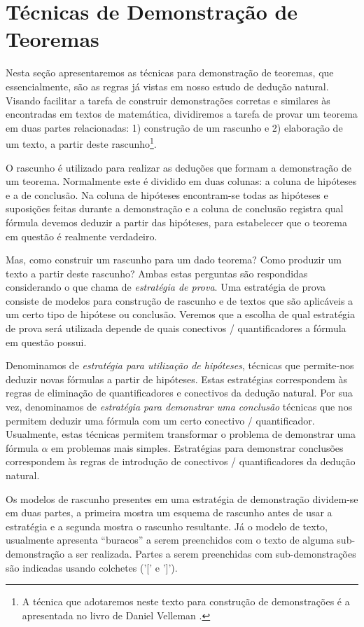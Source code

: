 \section{Técnicas de Demonstração de Teoremas}

Nesta seção apresentaremos as técnicas para demonstração de teoremas,
que essencialmente, são as regras já vistas em nosso estudo de dedução natural.
Visando facilitar a tarefa de construir demonstrações corretas e similares
às encontradas em textos de matemática, dividiremos a tarefa de
provar um teorema em duas partes relacionadas: 1) construção de um
rascunho e 2) elaboração de um texto, a partir deste rascunho\footnote{A
  técnica que adotaremos neste texto para construção de demonstrações
  é a apresentada no livro de Daniel Velleman \cite{Velleman06}.}.

O rascunho é utilizado para realizar as deduções que formam a
demonstração de um teorema. Normalmente este é dividido em duas
colunas: a coluna de hipóteses e a de conclusão. Na coluna de hipóteses
encontram-se todas as hipóteses e suposições feitas durante a
demonstração e a coluna de conclusão registra qual fórmula devemos
deduzir a partir das hipóteses, para estabelecer que o teorema em
questão é realmente verdadeiro.

Mas, como construir um rascunho para um dado teorema? Como produzir um
texto a partir deste rascunho? Ambas estas perguntas são respondidas
considerando o que \cite{Velleman06} chama de \emph{estratégia de
  prova}. Uma estratégia de prova consiste de modelos para construção de
rascunho e de textos que são aplicáveis a um certo tipo de hipótese ou
conclusão. Veremos que a escolha de qual estratégia de prova será
utilizada depende de quais conectivos / quantificadores a fórmula em
questão possui.

Denominamos de \emph{estratégia para utilização de
hipóteses}, técnicas que permite-nos deduzir novas fórmulas a partir de
hipóteses. Estas estratégias correspondem às regras de eliminação de
quantificadores e conectivos da dedução natural. Por sua vez,
denominamos de \emph{estratégia para demonstrar uma conclusão}
técnicas que nos permitem deduzir uma fórmula com um certo conectivo /
quantificador. Usualmente, estas técnicas permitem transformar o
problema de demonstrar uma fórmula $\alpha$ em problemas mais
simples. Estratégias para demonstrar conclusões correspondem às regras
de introdução de conectivos / quantificadores da dedução natural.

Os modelos de rascunho presentes em uma estratégia de demonstração
dividem-se em duas partes, a primeira mostra um esquema de rascunho
antes de usar a estratégia e a segunda mostra o rascunho
resultante. Já o modelo de texto, usualmente apresenta ``buracos''  a
serem preenchidos com o texto de alguma sub-demonstração a ser
realizada. Partes a serem preenchidas com sub-demonstrações são
indicadas usando colchetes ('[' e ']').


